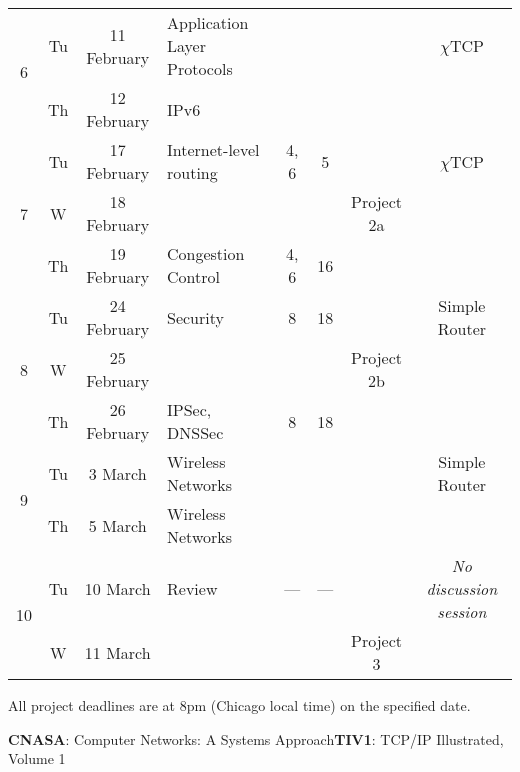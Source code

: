 \documentclass[11pt]{article}
\newcommand{\chitcp}{$\chi$\textsf{TCP}}
\begin{document}
\begin{sidewaystable}
\begin{tabular}{|c|cc||p{6cm}|c|c|c|c|}
\multirow{2}{*}{6}  & Tu & 11 February  & Application Layer Protocols &  &   & \cellcolor[gray]{0.9}  & \chitcp \\\cline{2-6}
                    & Th & 12 February  & IPv6                 &     &       & \cellcolor[gray]{0.9}  & \cellcolor[gray]{0.9} \\\hline\hline

\multirow{3}{*}{7}  & Tu & 17 February  & Internet-level routing                    & 4, 6 & 5       & \cellcolor[gray]{0.9} & \chitcp \\\cline{2-6}
                    & W  & 18 February  & \cellcolor[gray]{0.9} & \cellcolor[gray]{0.9} & \cellcolor[gray]{0.9} & Project 2a & \cellcolor[gray]{0.9} \\\cline{2-6}
                    & Th & 19 February  & Congestion Control                              & 4, 6 & 16      & \cellcolor[gray]{0.9}  & \cellcolor[gray]{0.9} \\\hline\hline

\multirow{3}{*}{8}  & Tu & 24 February  & Security                                        & 8    & 18      & \cellcolor[gray]{0.9}  & Simple Router \\\cline{2-6}
                    & W  & 25 February  & \cellcolor[gray]{0.9} & \cellcolor[gray]{0.9} & \cellcolor[gray]{0.9} & Project 2b & \cellcolor[gray]{0.9} \\\cline{2-6}
                    & Th & 26 February  & IPSec, DNSSec                                   & 8    & 18      & \cellcolor[gray]{0.9}  & \cellcolor[gray]{0.9} \\\hline\hline

\multirow{2}{*}{9}  & Tu & 3 March      & Wireless Networks                               &     &        & \cellcolor[gray]{0.9}  & Simple Router \\\cline{2-6}
                    & Th & 5 March      & Wireless Networks                               &     &        & \cellcolor[gray]{0.9}  & \cellcolor[gray]{0.9} \\\hline\hline

\multirow{2}{*}{10} & Tu & 10 March     & Review                                          & ---  & ---     & \cellcolor[gray]{0.9}  & \emph{No discussion session} \\\cline{2-7}
                    & W  & 11 March     & \cellcolor[gray]{0.9} & \cellcolor[gray]{0.9} & \cellcolor[gray]{0.9} &  Project 3 & \cellcolor[gray]{0.9} \\\hline
\end{tabular}
\begin{center}
All project deadlines are at 8pm (Chicago local time) on the specified date.

\textbf{CNASA}: Computer Networks: A Systems Approach\hspace{3ex}\textbf{TIV1}: TCP/IP Illustrated, Volume 1
\end{center}
\label{tab:calendar}
\end{sidewaystable}
\end{document}
